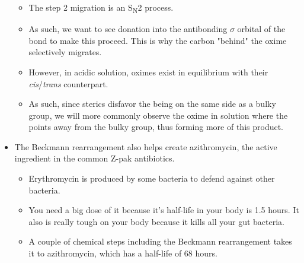 \documentclass[../notes.tex]{subfiles}
\begin{document}
\begin{itemize}
    \begin{itemize}
        \item The step 2 migration is an S\textsubscript{N}2 process.
        \item As such, we want to see donation into the antibonding $\sigma$ orbital of the  bond to make this proceed. This is why the carbon "behind" the oxime selectively migrates.
        \item However, in acidic solution, oximes exist in equilibrium with their \emph{cis}/\emph{trans} counterpart.
        \item As such, since sterics disfavor the  being on the same side as a bulky group, we will more commonly observe the oxime in solution where the  points away from the bulky group, thus forming more of this product.
    \end{itemize}
    \item The Beckmann rearrangement also helps create azithromycin, the active ingredient in the common Z-pak antibiotics.
    \begin{itemize}
        \item Erythromycin is produced by some bacteria to defend against other bacteria.
        \item You need a big dose of it because it's half-life in your body is 1.5 hours. It also is really tough on your body because it kills all your gut bacteria.
        \item A couple of chemical steps including the Beckmann rearrangement takes it to azithromycin, which has a half-life of 68 hours.
    \end{itemize}
\end{itemize}
\end{document}
